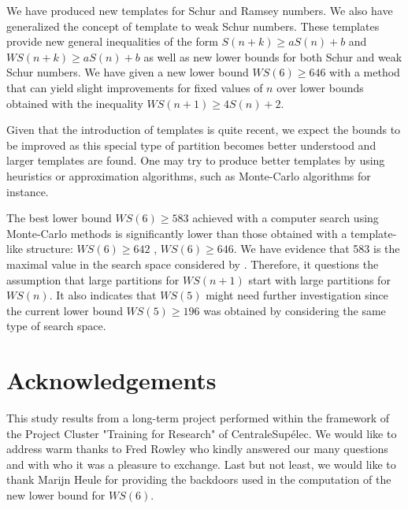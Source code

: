 \documentclass{article}
\newtheorem{computational theorem}[definition]{Computational Theorem}
\newcommand{\WS}{\mathit{WS}}
\begin{document}
We have produced new templates for Schur and Ramsey numbers. We also have generalized the concept of template to weak Schur numbers.
These templates provide new general inequalities of the form \(S(n+k) \geqslant a S(n) + b\) and \(\WS(n+k) \geqslant a S(n) + b\)
as well as new lower bounds for both Schur and weak Schur numbers. We have given a new lower bound \(\WS(6) \geqslant 646\) with
a method that can yield slight improvements for fixed values of \(n\) over lower bounds obtained with the inequality
\(\WS(n+1) \geqslant 4 S(n) + 2\).

Given that the introduction of templates is quite recent, we expect the bounds to be improved as this special type of partition
becomes better understood and larger templates are found. One may try to produce better templates by using heuristics or
approximation algorithms, such as Monte-Carlo algorithms for instance.

The best lower bound \(\WS(6) \geqslant 583\) achieved with a computer search using Monte-Carlo methods
\cite{EliahouBook} is significantly lower than those obtained with a template-like structure: \(\WS(6) \geqslant 642\) \cite{RowleyWS},
\(\WS(6) \geqslant 646\). We have evidence that 583 is the maximal value in the search space considered by
\cite{EliahouBook,Bouzy2015AnAP,Rafilipojaona}. Therefore, it questions the assumption that large partitions for \(\WS(n+1)\)
start with large partitions for \(\WS(n)\). It also indicates that \(\WS(5)\) might need further investigation since the current lower
bound \(\WS(5) \geqslant 196\) \cite{ELIAHOU2012175} was obtained by considering the same type of search space.


\section{Acknowledgements}

This study results from a long-term project performed within the framework of the Project Cluster "Training for Research" of CentraleSupélec.
We would like to address warm thanks to Fred Rowley who kindly answered our many questions
and with who it was a pleasure to exchange. Last but not least, we would like to thank Marijn Heule for providing the backdoors
used in the computation of the new lower bound for \(\WS(6)\).

%
%


\end{document}
